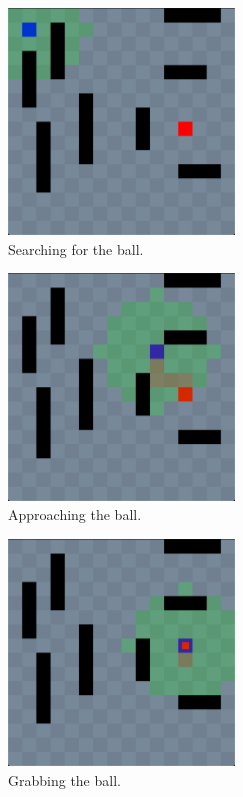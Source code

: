 \documentclass[a4paper,UKenglish,cleveref, autoref, thm-restate]{oasics-v2019}
\begin{document}
\begin{figure}
    \centering
    \includegraphics[width=6cm]{Searching.png}
    \caption{Searching for the ball.}
    \label{fig:searching}
\end{figure}

\begin{figure}
    \centering
    \includegraphics[width=6cm]{Approaching.png}
    \caption{Approaching the ball.}
    \label{fig:approaching}
\end{figure}


\begin{figure}
    \centering
    \includegraphics[width=6cm]{Grabbing.png}
    \caption{Grabbing the ball.}
    \label{fig:grabbing}
\end{figure}
\end{document}
